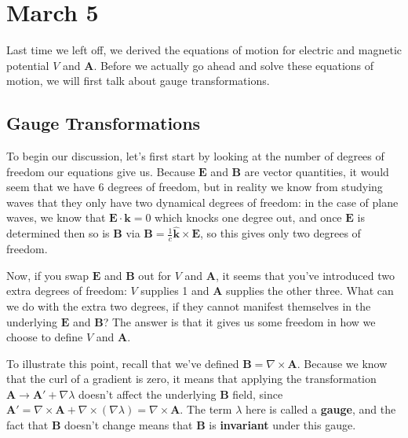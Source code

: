 \section{March 5}
Last time we left off, we derived the equations of motion for electric and magnetic potential \( V\) and 
\( \mathbf{A} \). Before we actually go ahead and solve these equations of motion, we will first talk about
gauge transformations. 


\subsection{Gauge Transformations}
To begin our discussion, let's first start by looking at the number of degrees of freedom our equations give
us. Because \( \mathbf{E} \) and \( \mathbf{B} \) are vector quantities, it would seem that we have 6 degrees
of freedom, but in reality we know from studying waves that they only have two dynamical degrees
of freedom: in the case of plane waves, we know that \( \mathbf{E} \cdot \mathbf{k} = 0 \) which knocks one
degree out, and once \( \mathbf{E} \) is determined then so is \( \mathbf{B} \) via \( \mathbf{B} =
\frac{1}{c}\mathbf{\hat{k}} \times \mathbf{E} \), so this gives only two degrees of freedom. 

Now, if you swap \( \mathbf{E} \) and \( \mathbf{B} \) out for \( V \) and \( \mathbf{A} \), it seems that
you've introduced two extra degrees of freedom: \( V \) supplies 1 and \( \mathbf{A} \) supplies the other
three. What can we do with the extra two degrees, if they cannot manifest themselves in the underlying \(
\mathbf{E} \) and \( \mathbf{B} \)? The answer is that it gives us some freedom in how we choose to define \(
V \) and \( \mathbf{A} \). 

To illustrate this point, recall that we've defined \( \mathbf{B} = \nabla \times \mathbf{A} \). Because we
know that the curl of a gradient is zero, it means that applying the transformation \( \mathbf{A} \to \mathbf{A}' +
\nabla \lambda \) doesn't affect the underlying \( \mathbf{B} \) field, since \(
\mathbf{A}' = \nabla \times \mathbf{A} + \nabla \times (\nabla \lambda) = \nabla \times \mathbf{A} \).  
The term \( \lambda \) here is called a \textbf{gauge}, and the fact that \( \mathbf{B} \) doesn't change
means that \( \mathbf{B} \) is \textbf{invariant} under this gauge. 

